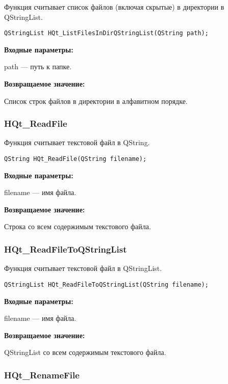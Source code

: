 \documentclass[a4paper,12pt]{article}
\begin{document}
Функция считывает список файлов (включая скрытые) в директории в QStringList.


\begin{lstlisting}[label=code_syntax_HQt_ListFilesInDirQStringList,caption=Синтаксис]
QStringList HQt_ListFilesInDirQStringList(QString path);
\end{lstlisting}

\textbf{Входные параметры:}

path --- путь к папке.

\textbf{Возвращаемое значение:}

Список строк файлов в директории в алфавитном порядке.


\subsubsection{HQt\_ReadFile}\label{HQt_ReadFile}

Функция считывает текстовой файл в QString.


\begin{lstlisting}[label=code_syntax_HQt_ReadFile,caption=Синтаксис]
QString HQt_ReadFile(QString filename);
\end{lstlisting}

\textbf{Входные параметры:}

filename --- имя файла.

\textbf{Возвращаемое значение:}

Строка со всем содержимым текстового файла.


\subsubsection{HQt\_ReadFileToQStringList}\label{HQt_ReadFileToQStringList}

Функция считывает текстовой файл в QStringList.


\begin{lstlisting}[label=code_syntax_HQt_ReadFileToQStringList,caption=Синтаксис]
QStringList HQt_ReadFileToQStringList(QString filename);
\end{lstlisting}

\textbf{Входные параметры:}

filename --- имя файла.

\textbf{Возвращаемое значение:}

QStringList со всем содержимым текстового файла.


\subsubsection{HQt\_RenameFile}\label{HQt_RenameFile}
\end{document}
